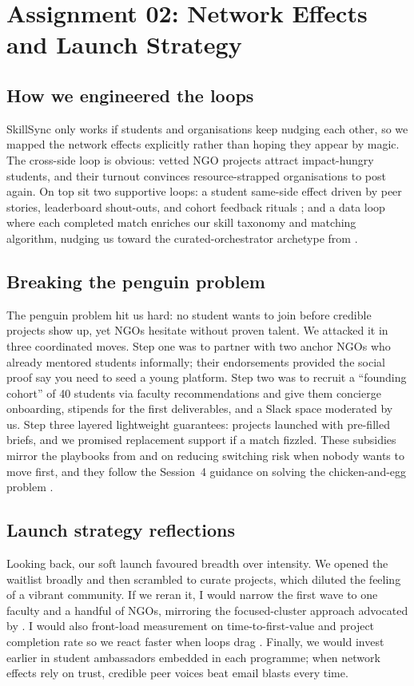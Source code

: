\section*{Assignment 02: Network Effects and Launch Strategy}

\subsection*{How we engineered the loops}
SkillSync only works if students and organisations keep nudging each other, so we mapped the network effects explicitly rather than hoping they appear by magic. The cross-side loop is obvious: vetted NGO projects attract impact-hungry students, and their turnout convinces resource-strapped organisations to post again. On top sit two supportive loops: a student same-side effect driven by peer stories, leaderboard shout-outs, and cohort feedback rituals \citep{Choudary2016}; and a data loop where each completed match enriches our skill taxonomy and matching algorithm, nudging us toward the curated-orchestrator archetype from \citet{Reillier2017}.

\subsection*{Breaking the penguin problem}
The penguin problem hit us hard: no student wants to join before credible projects show up, yet NGOs hesitate without proven talent. We attacked it in three coordinated moves. Step one was to partner with two anchor NGOs who already mentored students informally; their endorsements provided the social proof \citet{HagiuWright2013} say you need to seed a young platform. Step two was to recruit a ``founding cohort'' of 40 students via faculty recommendations and give them concierge onboarding, stipends for the first deliverables, and a Slack space moderated by us. Step three layered lightweight guarantees: projects launched with pre-filled briefs, and we promised replacement support if a match fizzled. These subsidies mirror the playbooks from \citet{Gunasilan2024} and \citet{FarrellSaloner1986} on reducing switching risk when nobody wants to move first, and they follow the Session~4 guidance on solving the chicken-and-egg problem \citep{Lecture04}.

\subsection*{Launch strategy reflections}
Looking back, our soft launch favoured breadth over intensity. We opened the waitlist broadly and then scrambled to curate projects, which diluted the feeling of a vibrant community. If we reran it, I would narrow the first wave to one faculty and a handful of NGOs, mirroring the focused-cluster approach advocated by \citet{Choudary2016}. I would also front-load measurement on time-to-first-value and project completion rate so we react faster when loops drag \citep{ShapiroVarian1999}. Finally, we would invest earlier in student ambassadors embedded in each programme; when network effects rely on trust, credible peer voices beat email blasts every time.

